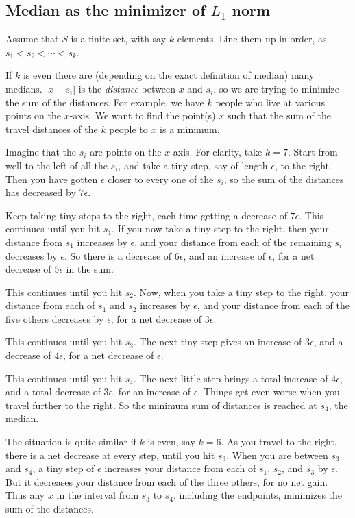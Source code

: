 \documentclass[12pt, letterpaper]{article}
\theoremstyle{definition}
\begin{document}
\subsection{Median as the minimizer of $L_1$ norm}
\label{medianMin}
Assume that $S$ is a finite set, with say $k$ elements. Line them up in order, as $s_1<s_2<\cdots <s_k$.  

If $k$ is even there are (depending on the exact definition of median) many medians. $|x-s_i|$ is the \textit{distance} between $x$ and $s_i$, so we are trying to minimize the sum of the distances. For example, we have $k$ people who live at various points on the $x$-axis. We want to find the point(s) $x$ such that the sum of the travel distances of the $k$ people to $x$ is a minimum.

Imagine that the $s_i$ are points on the $x$-axis. For clarity, take $k=7$. Start from well to the left of all the $s_i$, and take a tiny step, say of length $\epsilon$, to the right. Then you have gotten $\epsilon$ closer to every one of the $s_i$, so the sum of the distances has decreased by $7\epsilon$. 

Keep taking tiny steps to the right, each time getting a decrease of $7\epsilon$. This continues until you hit $s_1$. If you now take a tiny step to the right, then your distance from $s_1$ increases by $\epsilon$, and your distance from each of the remaining $s_i$  decreases by $\epsilon$. So there is a decrease of $6\epsilon$, and an increase of $\epsilon$, for a net decrease of $5\epsilon$ in the sum. 

This continues until you hit $s_2$. Now, when you take a tiny step to the right, your distance from each of $s_1$ and $s_2$ increases by $\epsilon$, and your distance from each of the five others decreases by $\epsilon$, for a net decrease of $3\epsilon$.

This continues until you hit $s_3$. The next tiny step gives an increase of $3\epsilon$, and a decrease of $4\epsilon$, for a net decrease of $\epsilon$.

This continues until you hit $s_4$. The next little step brings a total increase of $4\epsilon$, and a total decrease of $3\epsilon$, for an increase of $\epsilon$. Things get even worse when you travel further to the right. So the minimum sum of distances is reached at $s_4$, the median.

The situation is quite similar if $k$ is even, say $k=6$. As you travel to the right, there is a net decrease at every step, until you hit $s_3$. When you are between $s_3$ and $s_4$, a tiny step of $\epsilon$ increases your distance from each of $s_1$, $s_2$, and $s_3$ by $\epsilon$. But it decreases your distance from each of the three others, for no net gain. Thus any $x$ in the interval from  $s_3$ to $s_4$, including the endpoints, minimizes the sum of the distances. 
\end{document}

